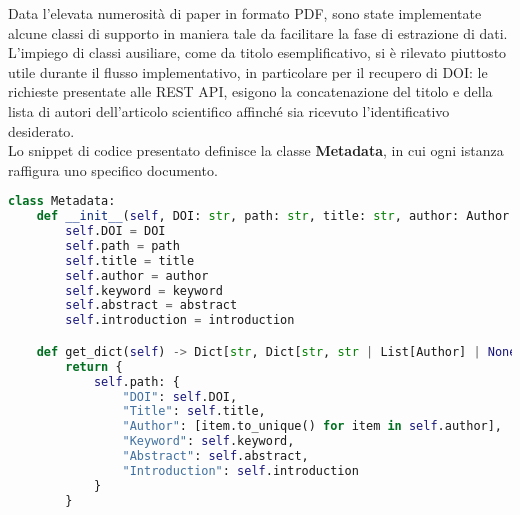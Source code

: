 Data l'elevata numerosità di paper in formato PDF, sono state implementate alcune classi di supporto in maniera tale da facilitare la fase di estrazione di dati. L'impiego di classi ausiliare, come da titolo esemplificativo, si è rilevato piuttosto utile durante il flusso implementativo, in particolare per il recupero di DOI: le richieste presentate alle REST API, esigono la concatenazione del titolo e della lista di autori dell'articolo scientifico affinché sia ricevuto l'identificativo desiderato. \vspace{7pt} \\
Lo snippet di codice presentato definisce la classe \textbf{Metadata}, in cui ogni istanza raffigura uno specifico documento. 
\begin{lstlisting}[language=python, label=lst:Metadata, caption=Classe Metadata]
class Metadata:
    def __init__(self, DOI: str, path: str, title: str, author: Author | ...):
        self.DOI = DOI
        self.path = path
        self.title = title
        self.author = author
        self.keyword = keyword
        self.abstract = abstract
        self.introduction = introduction

    def get_dict(self) -> Dict[str, Dict[str, str | List[Author] | None]]:
        return {
            self.path: {
                "DOI": self.DOI,
                "Title": self.title,
                "Author": [item.to_unique() for item in self.author],
                "Keyword": self.keyword,
                "Abstract": self.abstract,
                "Introduction": self.introduction
            }
        }
\end{lstlisting}